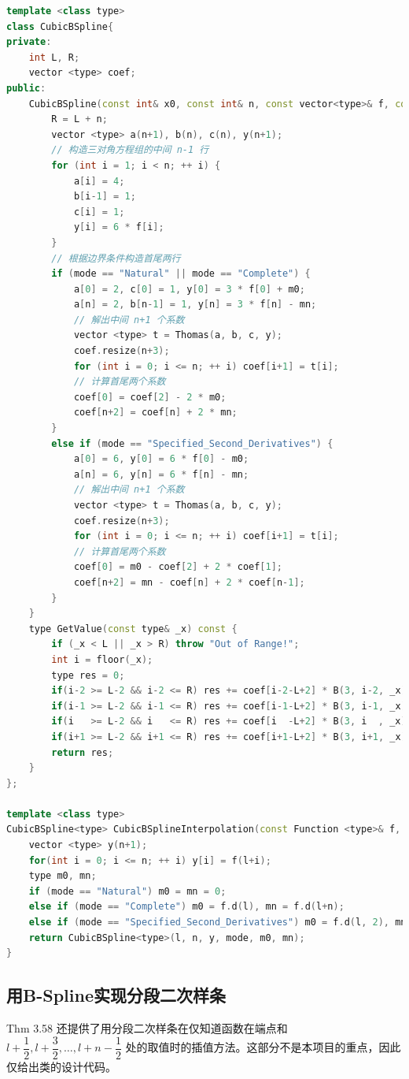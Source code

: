 \documentclass{ctexart}
\begin{document}
\begin{lstlisting}[language={c++}]
template <class type>
class CubicBSpline{
private:
	int L, R;
	vector <type> coef;
public:
	CubicBSpline(const int& x0, const int& n, const vector<type>& f, const string& mode = "Natural", const type& m0 = 0, const type& mn = 0) : L(x0) {
		R = L + n;
		vector <type> a(n+1), b(n), c(n), y(n+1);
		// 构造三对角方程组的中间 n-1 行
		for (int i = 1; i < n; ++ i) {
			a[i] = 4;
			b[i-1] = 1;
			c[i] = 1;
			y[i] = 6 * f[i];
		}
		// 根据边界条件构造首尾两行
		if (mode == "Natural" || mode == "Complete") {
			a[0] = 2, c[0] = 1, y[0] = 3 * f[0] + m0;
			a[n] = 2, b[n-1] = 1, y[n] = 3 * f[n] - mn;
			// 解出中间 n+1 个系数
			vector <type> t = Thomas(a, b, c, y);
			coef.resize(n+3);
			for (int i = 0; i <= n; ++ i) coef[i+1] = t[i];
			// 计算首尾两个系数
			coef[0] = coef[2] - 2 * m0;
			coef[n+2] = coef[n] + 2 * mn;
		}
		else if (mode == "Specified_Second_Derivatives") {
			a[0] = 6, y[0] = 6 * f[0] - m0;
			a[n] = 6, y[n] = 6 * f[n] - mn;
			// 解出中间 n+1 个系数
			vector <type> t = Thomas(a, b, c, y);
			coef.resize(n+3);
			for (int i = 0; i <= n; ++ i) coef[i+1] = t[i];
			// 计算首尾两个系数
			coef[0] = m0 - coef[2] + 2 * coef[1];
			coef[n+2] = mn - coef[n] + 2 * coef[n-1];
		}
	}
	type GetValue(const type& _x) const {
		if (_x < L || _x > R) throw "Out of Range!";
		int i = floor(_x);
		type res = 0;
		if(i-2 >= L-2 && i-2 <= R) res += coef[i-2-L+2] * B(3, i-2, _x);
		if(i-1 >= L-2 && i-1 <= R) res += coef[i-1-L+2] * B(3, i-1, _x);
		if(i   >= L-2 && i   <= R) res += coef[i  -L+2] * B(3, i  , _x);
		if(i+1 >= L-2 && i+1 <= R) res += coef[i+1-L+2] * B(3, i+1, _x);
		return res;
	}
};

template <class type>
CubicBSpline<type> CubicBSplineInterpolation(const Function <type>& f, const int& l, const int& n, const string& mode = "Natural") {
	vector <type> y(n+1);
	for(int i = 0; i <= n; ++ i) y[i] = f(l+i);
	type m0, mn;
	if (mode == "Natural") m0 = mn = 0;
	else if (mode == "Complete") m0 = f.d(l), mn = f.d(l+n);
	else if (mode == "Specified_Second_Derivatives") m0 = f.d(l, 2), mn = f.d(l+n, 2);
	return CubicBSpline<type>(l, n, y, mode, m0, mn);
}
\end{lstlisting}

\subsection{用B-Spline实现分段二次样条}

Thm 3.58 还提供了用分段二次样条在仅知道函数在端点和 $l+\dfrac 12,l+\dfrac 32,\dots,l+n-\dfrac 12$ 处的取值时的插值方法。这部分不是本项目的重点，因此仅给出类的设计代码。
\end{document}
